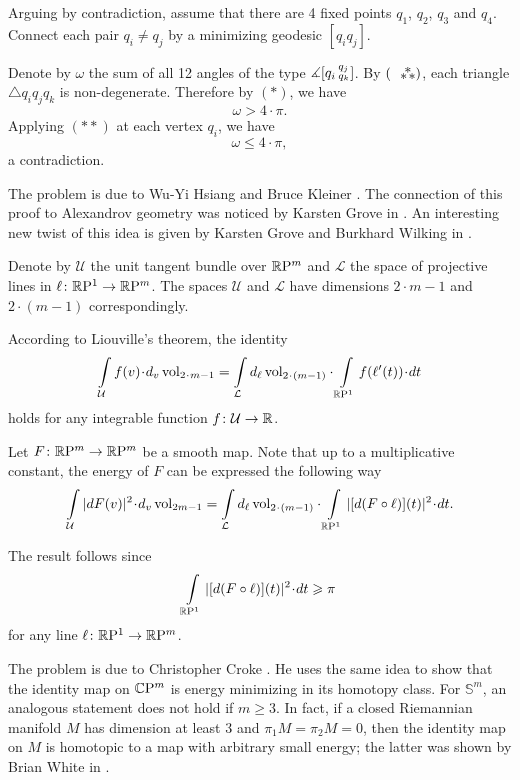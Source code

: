 Arguing by contradiction,
assume that there are 4 fixed points $q_1$, $q_2$, $q_3$ and $q_4$.
Connect each pair $q_i\ne q_j$ by a minimizing geodesic $[q_iq_j]$.

Denote by $\omega$ the sum of all 12 angles of the type  $\measuredangle[q_i\,{}^{q_j}_{q_k}]$.
By $(\asterism)$, each triangle $\triangle q_iq_jq_k$ is non-degenerate.
Therefore by $({*})$, we have
\[\omega>4\cdot\pi.\]
Applying $({*}{*})$ at each vertex $q_i$, we have 
\[\omega\le 4\cdot\pi,\]
a contradiction.\qeds


The problem is due to 
Wu-Yi Hsiang 
and Bruce Kleiner 
\cite[see][]{hsiang-kleiner}.
The connection of this proof to Alexandrov geometry was noticed by Karsten Grove in \cite{grove}.
An interesting new twist of this idea 
is given by 
Karsten Grove 
and Burkhard Wilking 
in  \cite{grove-wilking}.

Denote by $\mathcal{U}$ the unit tangent bundle over $\mathbb{R}\mathrm{P}^m$
and $\mathcal{L}$ the space of projective lines in $\ell\colon\mathbb{R}\mathrm{P}^1\to \mathbb{R}\mathrm{P}^m$.
The spaces $\mathcal{U}$ and $\mathcal{L}$ 
have dimensions $2\cdot m-1$ 
and $2\cdot(m-1)$
correspondingly.


According to Liouville's theorem, the identity
\[\int\limits_{\mathcal{U}}f(v)\cdot d_v\vol_{2\cdot m-1}
=
\int\limits_{\mathcal{L}}d_\ell\vol_{2\cdot(m-1)}\cdot\int\limits_{\RP^1} f(\ell'(t))\cdot dt\]
holds for any integrable function $f\colon\mathcal{U}\to\mathbb{R}$.

Let $F\colon\mathbb{R}\mathrm{P}^m\to\mathbb{R}\mathrm{P}^m$ be a smooth map.
Note that up to a multiplicative constant,
the energy of $F$ can be expressed the following way
\[\int\limits_{\mathcal{U}} |dF(v)|^2\cdot d_v\vol_{2m-1}
=
\int\limits_{\mathcal{L}}d_\ell\vol_{2\cdot(m-1)}\cdot\int\limits_{\RP^1} |[d(F\circ \ell)](t)|^2\cdot dt.\]

The result follows since
\[\int\limits_{\RP^1} |[d(F\circ \ell)](t)|^2\cdot dt\ge \pi\]
for any line $\ell\colon\mathbb{R}\mathrm{P}^1\to \mathbb{R}\mathrm{P}^m$.\qeds


The problem is due to Christopher Croke \cite[see][]{croke-energy}. 
He uses the same idea to show that the identity map on $\mathbb{C}\mathrm{P}^m$ is energy minimizing in its homotopy class.
For $\mathbb S^m$, an analogous statement does not hold if $m\ge 3$.
In fact, 
if a closed Riemannian manifold $M$ 
has dimension at least 3 
and $\pi_1M=\pi_2M=0$,
then the identity map on $M$ is homotopic 
to a map with arbitrary small energy;
the latter was shown by Brian White in \cite{white}.

